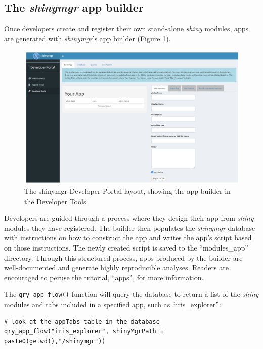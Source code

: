\subsection{\texorpdfstring{The \emph{shinymgr} app builder}{The shinymgr app builder}}\label{the-shinymgr-app-builder}

Once developers create and register their own stand-alone \emph{shiny} modules, apps are generated with \emph{shinymgr}'s app builder (Figure \ref{fig:fig5}).

\begin{figure}[h]
\includegraphics[width=1\linewidth]{images/figure5} \caption{The shinymgr Developer Portal layout, showing the app builder in the Developer Tools.}\label{fig:fig5}
\end{figure}

Developers are guided through a process where they design their app from \emph{shiny} modules they have registered. The builder then populates the \emph{shinymgr} database with instructions on how to construct the app and writes the app's script based on those instructions. The newly created script is saved to the ``modules\_app'' directory. Through this structured process, apps produced by the builder are well-documented and generate highly reproducible analyses. Readers are encouraged to peruse the tutorial, ``apps'', for more information.

The \texttt{qry\_app\_flow()} function will query the database to return a list of the \emph{shiny} modules and tabs included in a specified app, such as ``iris\_explorer'':

\begin{verbatim}
# look at the appTabs table in the database
qry_app_flow("iris_explorer", shinyMgrPath = paste0(getwd(),"/shinymgr"))
\end{verbatim}

